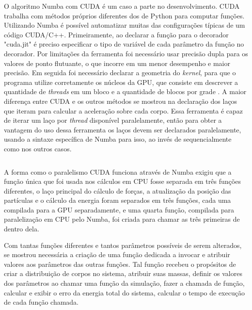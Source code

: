 \documentclass[
	12pt,				%
	a4paper,			%
	english,			%
	openright,				%
	brazil,				%
	oneside]{abntex2}
\begin{document}
	O algoritmo Numba com CUDA é um caso a parte no desenvolvimento. CUDA trabalha com métodos próprios diferentes dos de Python para computar funções. Utilizando Numba é possível automatizar muitas das configurações típicas de um código CUDA/C++. Primeiramente, ao declarar a função para o decorador "cuda.jit" é preciso especificar o tipo de variável de cada parâmetro da função no decorador. Por limitações da ferramenta foi necessário usar precisão dupla para os valores de ponto flutuante, o que incorre em um menor desempenho e maior precisão. Em seguida foi necessário declarar a geometria do \textit{kernel}, para que o programa utilize corretamente os núcleos da GPU, que consiste em descrever a quantidade de \textit{threads} em um bloco e a quantidade de blocos por grade \cite{numba} \cite{cuda}. A maior diferença entre CUDA e os outros métodos se mostrou na declaração dos laços que iteram para calcular a aceleração sobre cada corpo. Essa ferramenta é capaz de iterar um laço por \textit{thread} disponível paralelamente, então para obter a vantagem do uso dessa ferramenta os laços devem ser declarados paralelamente, usando a sintaxe específica de Numba para isso, ao invés de sequencialmente como nos outros casos. 
	
	\inputminted[fontsize=\footnotesize]{python}{nbody_codefrac4.py}
	
	A forma como o paralelismo CUDA funciona através de Numba exigiu que a função única que foi usada nos cálculos em CPU fosse separada em três funções diferentes, o laço principal do cálculo de forças, a atualização da posição das partículas e o cálculo da energia foram separados em três funções, cada uma compilada para a GPU separadamente, e uma quarta função, compilada para paralelização em CPU pelo Numba, foi criada para chamar as três primeiras de dentro dela.
	
	Com tantas funções diferentes e tantos parâmetros possíveis de serem alterados, se mostrou necessária a criação de uma função dedicada a invocar e atribuir valores aos parâmetros das outras funções. Tal função recebeu o propósitos de criar a distribuição de corpos no sistema, atribuir suas massas, definir os valores dos parâmetros ao chamar uma função da simulação, fazer a chamada de função, calcular e exibir o erro da energia total do sistema, calcular o tempo de execução de cada função chamada.
	
\end{document}
